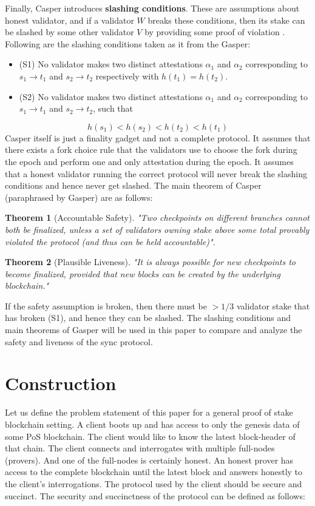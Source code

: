 \documentclass[a4paper,11pt,oneside]{article}
\newtheorem{theorem}{Theorem}
\theoremstyle{definition}
\begin{document}
  Finally, Casper introduces \textbf{slashing conditions}. These are assumptions about honest validator, and if a validator $W$ breaks these conditions, then its stake can be slashed by some other validator $V$ by providing some proof of violation \cite{Gasper}. Following are the slashing conditions taken as it from the Gasper\cite{Gasper}:
  \begin{itemize}
      \item (S1) No validator makes two distinct attestations $\alpha_1$ and $\alpha_2$ corresponding to $s_1 \rightarrow t_1$ and $s_2 \rightarrow t_2$ respectively with $h(t_1) = h(t_2)$.
      \item (S2) No validator makes two distinct attestations $\alpha_1$ and $\alpha_2$ corresponding to  $s_1 \rightarrow t_1$ and $s_2 \rightarrow t_2$, such that
  \end{itemize}
  $$h(s_1) < h(s_2) < h(t_2) < h(t_1)$$
  Casper itself is just a finality gadget and not a complete protocol\cite{Gasper}. It assumes that there exists a fork choice rule that the validators use to choose the fork during the epoch and perform one and only attestation during the epoch. It assumes that a honest validator running the correct protocol will never break the slashing conditions and hence never get slashed. The main theorem of Casper (paraphrased by Gasper) are as follows: 
  
  \begin{theorem}[Accountable Safety]
  "Two checkpoints on different branches cannot both be finalized, unless a set of validators owning stake above some total provably violated the protocol (and thus can be held accountable)".\cite{Gasper}
  \end{theorem}
  
  \begin{theorem}[Plausible Liveness]
  "It is always possible for new checkpoints to become finalized, provided that new blocks can be created by the underlying blockchain."\cite{Gasper}
  \end{theorem}
  
  If the safety assumption is broken, then there must be $>1/3$ validator stake that has broken (S1), and hence they can be slashed. The slashing conditions and main theorems of Gasper will be used in this paper to compare and analyze the safety and liveness of the sync protocol.

    \section{Construction}
    Let us define the problem statement of this paper for a general proof of stake blockchain setting. A client boots up and has access to only the genesis data of some PoS blockchain. The client would like to know the latest block-header of that chain. The client connects and interrogates with multiple full-nodes (provers). And one of the full-nodes is certainly honest. An honest prover has access to the complete blockchain until the latest block and answers honestly to the client's interrogations. The protocol used by the client should be secure and succinct. The security and succinctness of the protocol can be defined as follows:
    
\end{document}
